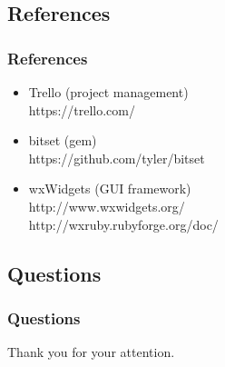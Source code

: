\subsection{References}
\begin{frame}
    \frametitle{References}
    \begin{itemize}
	\item Trello (project management)\\
		\alert{https://trello.com/}
	\item bitset (gem) \\
		\alert{https://github.com/tyler/bitset}
	\item wxWidgets (GUI framework)\\
		\alert{http://www.wxwidgets.org/} \\
		\alert{http://wxruby.rubyforge.org/doc/}
    \end{itemize}
\end{frame}

\subsection{Questions}
\begin{frame}
    \frametitle{Questions}
    \begin{center}
        Thank you for your attention.
    \end{center}
\end{frame}


